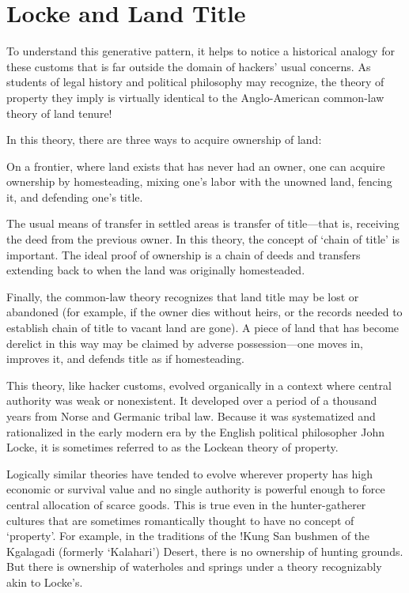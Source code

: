 \section{Locke and Land Title}


To understand this generative pattern, it helps to notice a historical analogy
for these customs that is far outside the domain of hackers' usual concerns.  As
students of legal history and political philosophy may recognize, the theory of
property they imply is virtually identical to the Anglo-American common-law
theory of land tenure!

In this theory, there are three ways to acquire ownership of land:

On a frontier, where land exists that has never had an owner, one can acquire
ownership by homesteading, mixing one's labor with the unowned land, fencing it,
and defending one's title.

The usual means of transfer in settled areas is transfer of title—that is,
receiving the deed from the previous owner.  In this theory, the concept of
`chain of title' is important.  The ideal proof of ownership is a chain of deeds
and transfers extending back to when the land was originally homesteaded.

Finally, the common-law theory recognizes that land title may be lost or
abandoned (for example, if the owner dies without heirs, or the records needed
to establish chain of title to vacant land are gone).  A piece of land that has
become derelict in this way may be claimed by adverse possession—one moves in,
improves it, and defends title as if homesteading.

This theory, like hacker customs, evolved organically in a context where central
authority was weak or nonexistent.  It developed over a period of a thousand
years from Norse and Germanic tribal law.  Because it was systematized and
rationalized in the early modern era by the English political philosopher John
Locke, it is sometimes referred to as the Lockean theory of property.

Logically similar theories have tended to evolve wherever property has high
economic or survival value and no single authority is powerful enough to force
central allocation of scarce goods.  This is true even in the hunter-gatherer
cultures that are sometimes romantically thought to have no concept of
`property'.  For example, in the traditions of the !Kung San bushmen of the
Kgalagadi (formerly `Kalahari') Desert, there is no ownership of hunting
grounds.  But there is ownership of waterholes and springs under a theory
recognizably akin to Locke's.

